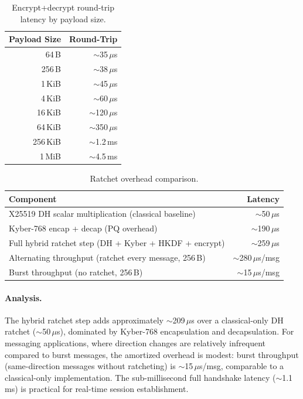 \documentclass[11pt,a4paper]{article}
\theoremstyle{definition}
\begin{document}
\begin{table}[H]
\centering
\caption{Encrypt+decrypt round-trip latency by payload size.}\label{tab:bench-payload}
\small
\begin{tabular}{@{}rr@{}}
\toprule
Payload Size & Round-Trip \\
\midrule
64\,B & $\sim$35\,$\mu$s \\
256\,B & $\sim$38\,$\mu$s \\
1\,KiB & $\sim$45\,$\mu$s \\
4\,KiB & $\sim$60\,$\mu$s \\
16\,KiB & $\sim$120\,$\mu$s \\
64\,KiB & $\sim$350\,$\mu$s \\
256\,KiB & $\sim$1.2\,ms \\
1\,MiB & $\sim$4.5\,ms \\
\bottomrule
\end{tabular}
\end{table}

\begin{table}[H]
\centering
\caption{Ratchet overhead comparison.}\label{tab:bench-overhead}
\small
\begin{tabular}{@{}lr@{}}
\toprule
Component & Latency \\
\midrule
X25519 DH scalar multiplication (classical baseline) & $\sim$50\,$\mu$s \\
Kyber-768 encap + decap (PQ overhead) & $\sim$190\,$\mu$s \\
Full hybrid ratchet step (DH + Kyber + HKDF + encrypt) & $\sim$259\,$\mu$s \\
\midrule
Alternating throughput (ratchet every message, 256\,B) & $\sim$280\,$\mu$s/msg \\
Burst throughput (no ratchet, 256\,B) & $\sim$15\,$\mu$s/msg \\
\bottomrule
\end{tabular}
\end{table}

\paragraph{Analysis.}
The hybrid ratchet step adds approximately $\sim$209\,$\mu$s over a classical-only DH ratchet ($\sim$50\,$\mu$s), dominated by Kyber-768 encapsulation and decapsulation. For messaging applications, where direction changes are relatively infrequent compared to burst messages, the amortized overhead is modest: burst throughput (same-direction messages without ratcheting) is $\sim$15\,$\mu$s/msg, comparable to a classical-only implementation. The sub-millisecond full handshake latency ($\sim$1.1\,ms) is practical for real-time session establishment.
\end{document}

